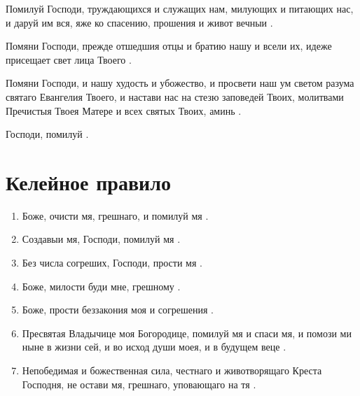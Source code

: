 \begin{mymulticols}
Помилуй Господи, труждающихся и служащих нам, милующих и питающих нас, и даруй им вся, яже ко спасению, прошения и живот вечныи .

Помяни Господи, прежде отшедшия отцы и братию нашу и всели их, идеже присещает свет лица Твоего .

Помяни Господи, и нашу худость и убожество, и просвети наш ум светом разума святаго Евангелия Твоего, и настави нас на стезю заповедей Твоих, молитвами Пречистыя Твоея Матере и всех святых Твоих, аминь .

Господи, помилуй . 



\end{mymulticols}

\section{Келейное правило}\begin{mymulticols}



\begin{enumerate}

\item Боже, очисти мя, грешнаго, и помилуй мя .

\item Создавыи мя, Господи, помилуй мя .

\item Без числа согреших, Господи, прости мя .

\item Боже, милости буди мне, грешному .

\item Боже, прости беззакония моя и согрешения .

\item Пресвятая Владычице моя Богородице, помилуй мя и спаси мя, и помози ми ныне в жизни сей, и во исход души моея, и в будущем веце .

\item Непобедимая и божественная сила, честнаго и животворящаго Креста Господня, не остави мя, грешнаго, уповающаго на тя .


\end{enumerate}
\end{mymulticols}
